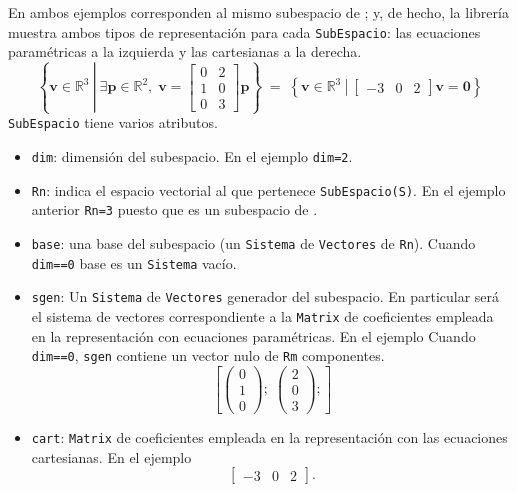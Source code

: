 \documentclass[11pt]{report}
\begin{document}
En ambos ejemplos corresponden al mismo subespacio de \R[3]; y, de
hecho, la librería muestra ambos tipos de representación para cada
\texttt{SubEspacio}: las ecuaciones paramétricas a la izquierda y las
cartesianas a la derecha.
\begin{displaymath}
  \left\{ \boldsymbol{v}\in\mathbb{R}^3\ \left|\ \exists\boldsymbol{p}\in\mathbb{R}^2,\; \boldsymbol{v}= \begin{bmatrix}0&2\\1&0\\0&3\end{bmatrix}\boldsymbol{p}\right. \right\}\; = \;\left\{ \boldsymbol{v}\in\mathbb{R}^3\ \left|\ \begin{bmatrix}-3&0&2\end{bmatrix}\boldsymbol{v}=\boldsymbol{0}\right.\right\}
\end{displaymath}
\texttt{SubEspacio} tiene varios atributos.
\begin{itemize}
\item \texttt{dim}: dimensión del subespacio. En el ejemplo \texttt{dim=2}.
\item \texttt{Rn}: indica el espacio vectorial \R[n] al que pertenece
\texttt{SubEspacio(S)}. En el ejemplo anterior \texttt{Rn=3} puesto que es un
subespacio de \R[3].
\item \texttt{base}: una base del subespacio (un \texttt{Sistema} de \texttt{Vectores} de
\texttt{Rn}). Cuando \texttt{dim==0} base es un \texttt{Sistema} vacío.
\item \texttt{sgen}: Un \texttt{Sistema} de \texttt{Vectores} generador del subespacio. En
particular será el sistema de vectores correspondiente a la \texttt{Matrix}
de coeficientes empleada en la representación con ecuaciones
paramétricas. En el ejemplo Cuando \texttt{dim==0}, \texttt{sgen} contiene un
vector nulo de \texttt{Rm} componentes.
\begin{displaymath}
  \left[\begin{pmatrix}0\\1\\0\end{pmatrix};\;\begin{pmatrix}2\\0\\3\end{pmatrix};\right]
\end{displaymath}
\item \texttt{cart}: \texttt{Matrix} de coeficientes empleada en la representación con
las ecuaciones cartesianas. En el ejemplo
\begin{displaymath}
  \begin{bmatrix}
    -3 & 0 & 2
  \end{bmatrix}.
\end{displaymath}
\end{itemize}
\end{document}
